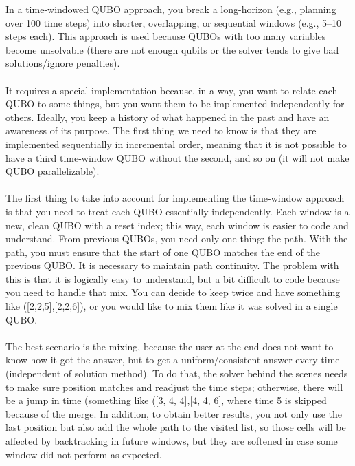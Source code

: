 \documentclass[11pt]{article}
\begin{document}
In a time-windowed QUBO approach, you break a long-horizon  \cite{RecedingHorizon} (e.g., planning over 100 time steps) into shorter, overlapping, or sequential windows (e.g., 5–10 steps each). This approach is used because QUBOs with too many variables become unsolvable (there are not enough qubits or the solver tends to give bad solutions/ignore penalties). \\
\\
It requires a special implementation because, in a way, you want to relate each QUBO to some things, but you want them to be implemented independently for others. Ideally, you keep a history of what happened in the past and have an awareness of its purpose. The first thing we need to know is that they are implemented sequentially in incremental order, meaning that it is not possible to have a third time-window QUBO without the second, and so on (it will not make QUBO parallelizable).\\
\\
The first thing to take into account for implementing the time-window approach is that you need to treat each QUBO essentially independently. Each window is a new, clean QUBO with a reset index; this way, each window is easier to code and understand. From previous QUBOs, you need only one thing: the path. With the path, you must ensure that the start of one QUBO matches the end of the previous QUBO. It is necessary to maintain path continuity. The problem with this is that it is logically easy to understand, but a bit difficult to code because you need to handle that mix. You can decide to keep twice and have something like ([2,2,5],[2,2,6]), or you would like to mix them like it was solved in a single QUBO. \\
\\
The best scenario is the mixing, because the user at the end does not want to know how it got the answer, but to get a uniform/consistent answer every time (independent of solution method). To do that, the solver behind the scenes needs to make sure position matches and readjust the time steps; otherwise, there will be a jump in time (something like ([3, 4, 4],[4, 4, 6], where time 5 is skipped because of the merge. In addition, to obtain better results, you not only use the last position but also add the whole path to the visited list, so those cells will be affected by backtracking in future windows, but they are softened in case some window did not perform as expected. \\
\\
\end{document}
